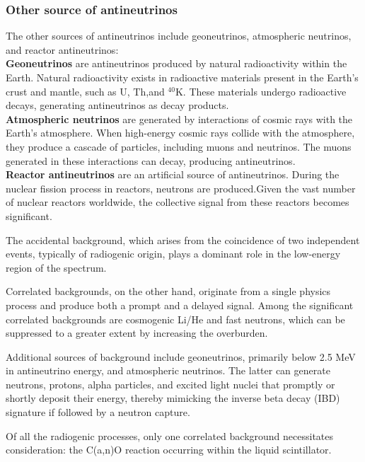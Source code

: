 \subsubsection*{Other source of antineutrinos}

The other sources of antineutrinos include geoneutrinos, atmospheric neutrinos, and reactor antineutrinos:\\

\textbf{Geoneutrinos} are antineutrinos produced by natural radioactivity within the Earth. Natural radioactivity exists in radioactive materials present in the Earth's crust and mantle, such as $\mathrm{U}$, $\mathrm{Th}$,and $^{40}\mathrm{K}$. These materials undergo radioactive decays, generating antineutrinos as decay products.\\

\textbf{Atmospheric neutrinos} are generated by interactions of cosmic rays with the Earth's atmosphere. When high-energy cosmic rays collide with the atmosphere, they produce a cascade of particles, including muons and neutrinos. The muons generated in these interactions can decay, producing antineutrinos.\\

\textbf{Reactor antineutrinos} are an artificial source of antineutrinos. During the nuclear fission process in reactors, neutrons are produced.Given the vast number of nuclear reactors worldwide, the collective signal from these reactors becomes significant.






The accidental background, which arises from the coincidence of two independent events, typically of radiogenic origin, plays a dominant role in the low-energy region of the spectrum.

Correlated backgrounds, on the other hand, originate from a single physics process and produce both a prompt and a delayed signal. Among the significant correlated backgrounds are cosmogenic Li/He and fast neutrons, which can be suppressed to a greater extent by increasing the overburden.

Additional sources of background include geoneutrinos, primarily below 2.5 MeV in antineutrino energy, and atmospheric neutrinos. The latter can generate neutrons, protons, alpha particles, and excited light nuclei that promptly or shortly deposit their energy, thereby mimicking the inverse beta decay (IBD) signature if followed by a neutron capture.

Of all the radiogenic processes, only one correlated background necessitates consideration: the C(a,n)O reaction occurring within the liquid scintillator.


